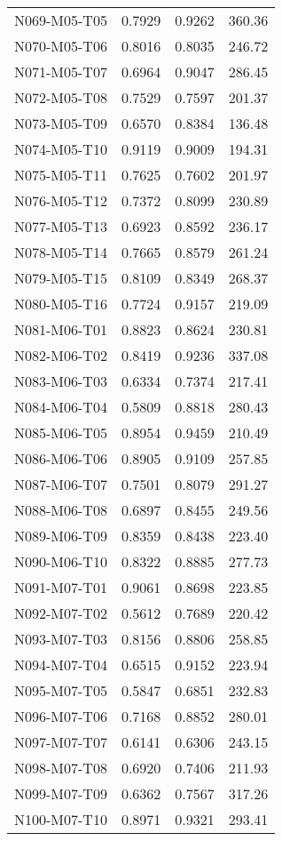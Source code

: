 \begin{longtable}[c]{|l|c|l|l|}
N069-M05-T05 & 0.7929 & 0.9262 & 360.36 \\
N070-M05-T06 & 0.8016 & 0.8035 & 246.72 \\
N071-M05-T07 & 0.6964 & 0.9047 & 286.45 \\
N072-M05-T08 & 0.7529 & 0.7597 & 201.37 \\
N073-M05-T09 & 0.6570 & 0.8384 & 136.48 \\
N074-M05-T10 & 0.9119 & 0.9009 & 194.31 \\
N075-M05-T11 & 0.7625 & 0.7602 & 201.97 \\
N076-M05-T12 & 0.7372 & 0.8099 & 230.89 \\
N077-M05-T13 & 0.6923 & 0.8592 & 236.17 \\
N078-M05-T14 & 0.7665 & 0.8579 & 261.24 \\
N079-M05-T15 & 0.8109 & 0.8349 & 268.37 \\
N080-M05-T16 & 0.7724 & 0.9157 & 219.09 \\
N081-M06-T01 & 0.8823 & 0.8624 & 230.81 \\
N082-M06-T02 & 0.8419 & 0.9236 & 337.08 \\
N083-M06-T03 & 0.6334 & 0.7374 & 217.41 \\
N084-M06-T04 & 0.5809 & 0.8818 & 280.43 \\
N085-M06-T05 & 0.8954 & 0.9459 & 210.49 \\
N086-M06-T06 & 0.8905 & 0.9109 & 257.85 \\
N087-M06-T07 & 0.7501 & 0.8079 & 291.27 \\
N088-M06-T08 & 0.6897 & 0.8455 & 249.56 \\
N089-M06-T09 & 0.8359 & 0.8438 & 223.40 \\
N090-M06-T10 & 0.8322 & 0.8885 & 277.73 \\
N091-M07-T01 & 0.9061 & 0.8698 & 223.85 \\
N092-M07-T02 & 0.5612 & 0.7689 & 220.42 \\
N093-M07-T03 & 0.8156 & 0.8806 & 258.85 \\
N094-M07-T04 & 0.6515 & 0.9152 & 223.94 \\
N095-M07-T05 & 0.5847 & 0.6851 & 232.83 \\
N096-M07-T06 & 0.7168 & 0.8852 & 280.01 \\
N097-M07-T07 & 0.6141 & 0.6306 & 243.15 \\
N098-M07-T08 & 0.6920 & 0.7406 & 211.93 \\
N099-M07-T09 & 0.6362 & 0.7567 & 317.26 \\
N100-M07-T10 & 0.8971 & 0.9321 & 293.41 \\
\hline

\end{longtable}

